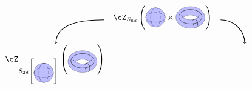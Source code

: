 \begin{equation*}
\begin{array}{rcl}
	\begin{tikzpicture}[baseline={(0,0)}]
		\draw[->, thick] (0,0) to [out=180, in=90] (-2,-1);
	\end{tikzpicture}
	&\cZ_{S_{6d}}\left(\begin{tikzpicture}[scale=.4,baseline={(0,-.1)}]
		\draw (-1,0) arc (180:360:1cm and 0.5cm);
    	\draw[dashed] (-1,0) arc (180:0:1cm and 0.5cm);
    	\draw (0,1) arc (90:270:0.5cm and 1cm);
    	\draw[dashed] (0,1) arc (90:-90:0.5cm and 1cm);
 		\filldraw[fill=blue!50, opacity=.5] (0,0) circle (1cm);
	\end{tikzpicture}\times
	\begin{tikzpicture}[scale=.6, baseline={(0,-.1)}]
		\draw[fill=blue!50,opacity=.5,even odd rule] (0,0) ellipse (1 and .75) 
		(-0.5,0) arc(120:60:1 and 1.25)  arc(-60:-120:1 and 1.25) coordinate[pos=0.25] (xt);
	   \draw (-0.5,0) arc(-120:-130:1 and 1.25) (0.5,0) arc(-60:-50:1 and 1.25);
	   \draw[] (-65:1 and .75) to[out=40,in=10] 
		node[pos=0.2,right]{} (xt);
	   \draw[dashed] (xt) to[out=-170,in=-140] (-65:1 and .75);
	   \draw[] (0.8,0.05) arc(0:360:0.8 and .5) {};
	\end{tikzpicture}\right)&
	\begin{tikzpicture}[baseline={(0,0)}]
		\draw[thick, ->] (0,0) to [out=0, in=90] (1,-1);
	\end{tikzpicture}\\[15pt]
	\cZ_{S_{2d}\left[\begin{tikzpicture}[scale=.4,baseline={(0,0)}]
		\draw (-1,0) arc (180:360:1cm and 0.5cm);
		\draw[dashed] (-1,0) arc (180:0:1cm and 0.5cm);
		\draw (0,1) arc (90:270:0.5cm and 1cm);
		\draw[dashed] (0,1) arc (90:-90:0.5cm and 1cm);
		\filldraw[fill=blue!50, opacity=.5] (0,0) circle (1cm);
	\end{tikzpicture}\right]}\left(
	\begin{tikzpicture}[scale=.6, baseline={(0,0)}]
		\draw[fill=blue!50,opacity=.5,even odd rule] (0,0) ellipse (1 and .75) 
		(-0.5,0) arc(120:60:1 and 1.25)  arc(-60:-120:1 and 1.25) coordinate[pos=0.25] (xt);
		\draw (-0.5,0) arc(-120:-130:1 and 1.25) (0.5,0) arc(-60:-50:1 and 1.25);
		\draw[] (-65:1 and .75) to[out=40,in=10] 
		node[pos=0.2,right]{} (xt);
		\draw[dashed] (xt) to[out=-170,in=-140] (-65:1 and .75);
		\draw[] (0.8,0.05) arc(0:360:0.8 and .5) {};
	\end{tikzpicture}\right)

\end{array}
\end{equation*}
